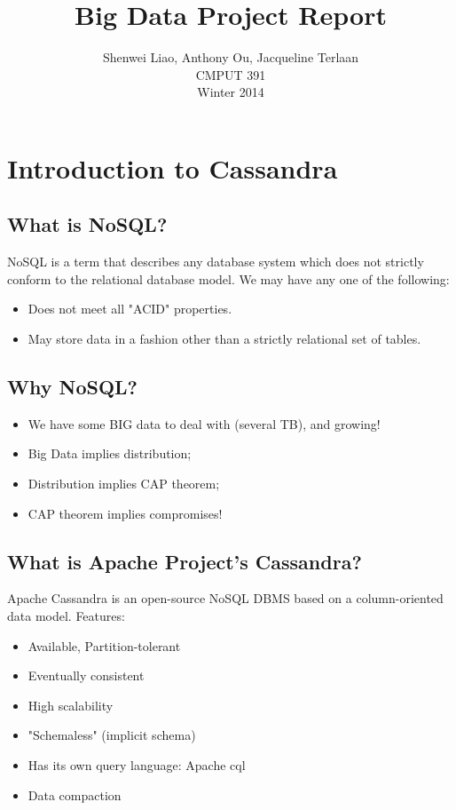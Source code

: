 \documentclass[letterpaper]{article}
\title{Big Data Project Report}
\author{Shenwei Liao, Anthony Ou, Jacqueline Terlaan\\
	CMPUT 391\\
Winter 2014}
\begin{document}
\maketitle
\section{Introduction to Cassandra}
\lstset{postbreak=\space, breakindent=5pt, breaklines}

\subsection{What is NoSQL?}
NoSQL is a term that describes any database system which does not strictly
conform to the relational database model. We may have any one of the
following:
\begin{itemize}
	\item Does not meet all "ACID" properties.
	\item May store data in a fashion other than a strictly
		relational set of tables.
\end{itemize}

\subsection{Why NoSQL?}
\begin{itemize}
	\item We have some BIG data to deal with (several TB), and growing!
	\item Big Data implies distribution;
	\item Distribution implies CAP theorem;
	\item CAP theorem implies compromises!
\end{itemize}

\subsection{What is Apache Project's Cassandra?}
Apache Cassandra is an open-source NoSQL DBMS based on a
column-oriented data model. 
Features:
\begin{itemize}
	\item Available, Partition-tolerant
	\item Eventually consistent
	\item High scalability
	\item "Schemaless" (implicit schema)
	\item Has its own query language: Apache cql
	\item Data compaction
\end{itemize}
\end{document}
